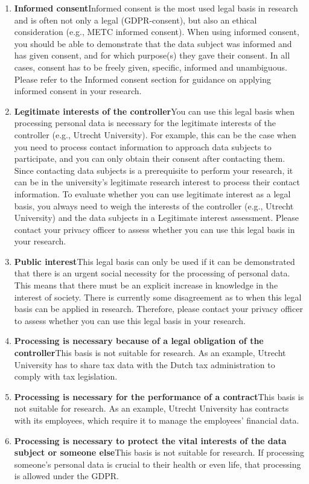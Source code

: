 \documentclass[
]{book}
\providecommand{\tightlist}{%
  \setlength{\itemsep}{0pt}\setlength{\parskip}{0pt}}
\begin{document}
\begin{enumerate}
\def\labelenumi{\arabic{enumi}.}
\tightlist
\item
  \textbf{Informed consent}Informed consent is the most used legal basis in research and is often not only a legal (GDPR-consent), but also an ethical consideration (e.g., METC informed consent). When using informed consent, you should be able to demonstrate that the data subject was informed and has given consent, and for which purpose(s) they gave their consent. In all cases, consent has to be freely given, specific, informed and unambiguous. Please refer to the Informed consent section for guidance on applying informed consent in your research.
\item
  \textbf{Legitimate interests of the controller}You can use this legal basis when processing personal data is necessary for the legitimate interests of the controller (e.g., Utrecht University). For example, this can be the case when you need to process contact information to approach data subjects to participate, and you can only obtain their consent after contacting them. Since contacting data subjects is a prerequisite to perform your research, it can be in the university's legitimate research interest to process their contact information. To evaluate whether you can use legitimate interest as a legal basis, you always need to weigh the interests of the controller (e.g., Utrecht University) and the data subjects in a Legitimate interest assessment. Please contact your privacy officer to assess whether you can use this legal basis in your research.
\item
  \textbf{Public interest}This legal basis can only be used if it can be demonstrated that there is an urgent social necessity for the processing of personal data. This means that there must be an explicit increase in knowledge in the interest of society. There is currently some disagreement as to when this legal basis can be applied in research. Therefore, please contact your privacy officer to assess whether you can use this legal basis in your research.
\item
  \textbf{Processing is necessary because of a legal obligation of the controller}This basis is not suitable for research. As an example, Utrecht University has to share tax data with the Dutch tax administration to comply with tax legislation.
\item
  \textbf{Processing is necessary for the performance of a contract}This basis is not suitable for research. As an example, Utrecht University has contracts with its employees, which require it to manage the employees' financial data.
\item
  \textbf{Processing is necessary to protect the vital interests of the data subject or someone else}This basis is not suitable for research. If processing someone's personal data is crucial to their health or even life, that processing is allowed under the GDPR.
\end{enumerate}
\end{document}

